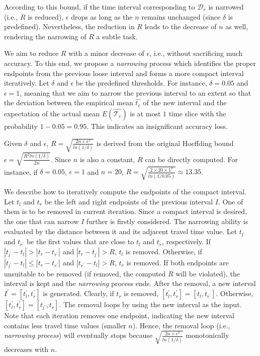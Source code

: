 \documentclass{vldb}
\begin{document}
	According to this bound, if the time interval corresponding to $\mathcal{D}_e$ is narrowed (i.e., $R$ is reduced), $\epsilon$ drops as long as the $n$ remains unchanged (since $\delta$ is predefined).  
	Nevertheless, the reduction in $R$ leads to the decrease of $n$ as well, rendering the narrowing of $R$ a subtle task.
	
	We aim to reduce $R$ with a minor decrease of $\epsilon$, i.e., without sacrificing much accuracy. To this end, we propose a \textit{narrowing} process which identifies the proper endpoints from the previous loose interval and forms a more compact interval iteratively. 
	Let $\delta$ and $\epsilon$ be the predefined thresholds. For instance, $\delta=0.05$ and $\epsilon=1$, meaning that we aim to narrow the previous interval to an extent so that the deviation between the empirical mean $\widehat{t_e}$ of the new interval and the expectation of the actual mean $E(\widehat{\mathcal{T}_e})$ is at most $1$ time slice with the probability $1-0.05=0.95$. This indicates an insignificant accuracy loss.
	
	Given $\delta$ and $\epsilon$, $R=\sqrt{\frac{2n\times \epsilon^2}{ln(1/\delta)}}$ is derived from the original Hoeffding bound  $\epsilon=\sqrt{\frac{R^2ln(1/\delta)}{2n}}$. Since $n$ is also a constant, $R$ can be directly computed. For instance, if $\delta=0.05$, $\epsilon=1$ and $n=20$, $R=\sqrt{\frac{2\times 20\times 1^2}{ln(1/0.05)}}\approx13.35$. %
		
	We describe how to iteratively compute the endpoints of the compact interval. %
	Let $t_l$ and $t_r$ be the left and right endpoints of the previous interval $I$. One of them is to be removed in current iteration. Since a compact interval is desired, the one that can narrow $I$ further is firstly considered. 
	The narrowing ability is evaluated by the distance between it and its adjacent travel time value. Let $t_{l^\prime}$ and $t_{r^\prime}$ be the first values that are close to $t_l$ and $t_r$, respectively. If $|t_{l^\prime}-t_l|>|t_{r}-t_{r^\prime}|$ and $|t_{r}-t_{l^\prime}|>R$, $t_l$ is removed. Otherwise, if $|t_{l^\prime}-t_l|\leq|t_{r}-t_{r^\prime}|$ and $|t_{r^\prime}-t_{l}|>R$, $t_r$ is removed. If both endpoints are unsuitable to be removed (if removed, the computed $R$ will be violated), the interval is kept and the \textit{narrowing} process ends.
	After the removal, a new interval $I^\prime=[t_l^\prime, t_r^\prime]$ is generated. Clearly, if $t_r$ is removed, $[t_l^\prime, t_r^\prime]=[t_l, t_{r^\prime}]$. Otherwise,
	$[t_l^\prime, t_r^\prime]=[t_{l^\prime}, t_{r}]$. 
	The removal loops by using the new interval as the input.
	Note that each iteration removes one endpoint, indicating the new interval contains less travel time values (smaller $n$).
	Hence, the removal loop (i.e., {\it narrowing process}) will eventually stops because $\sqrt{\frac{2n\times \epsilon^2}{ln(1/\delta)}}$ monotonically decreases with $n$.
		
\end{document}
